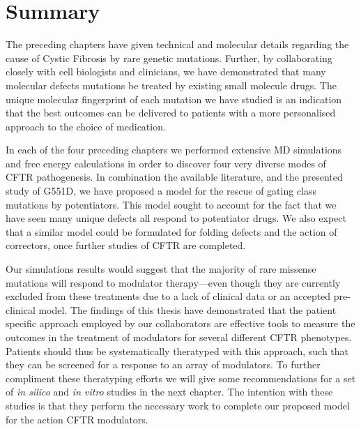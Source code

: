 

\section{Summary}
The preceding chapters have given technical and molecular details regarding the cause of Cystic Fibrosis by rare genetic mutations. Further, by collaborating closely with cell biologists and clinicians, we have demonstrated that many molecular defects mutations be treated by existing small molecule drugs. The unique molecular fingerprint of each mutation we have studied is an indication that the best outcomes can be delivered to patients with a more personalised approach to the choice of medication. 

In each of the four preceding chapters we performed extensive MD simulations and free energy calculations in order to discover four very diverse modes of CFTR pathogenesis. In combination the available literature, and the presented study of G551D, we have proposed a model for the rescue of gating class mutations by potentiators. This model sought to account for the fact that we have seen many unique defects all respond to potentiator drugs. We also expect that a similar model could be formulated for folding defects and the action of correctors, once further studies of CFTR are completed. 

Our simulations results would suggest that the majority of rare missense mutations will respond to modulator therapy---even though they are currently excluded from these treatments due to a lack of clinical data or an accepted pre-clinical model. The findings of this thesis have demonstrated that the patient specific approach employed by our collaborators are effective tools to measure the outcomes in the treatment of modulators for several different CFTR phenotypes. Patients should thus be systematically theratyped with this approach, such that they can be screened for a response to an array of modulators. To further compliment these theratyping efforts we will give some recommendations for a set of \textit{in silico} and \textit{in vitro} studies in the next chapter. The intention with these studies is that they perform the necessary work to complete our proposed model for the action CFTR modulators.

